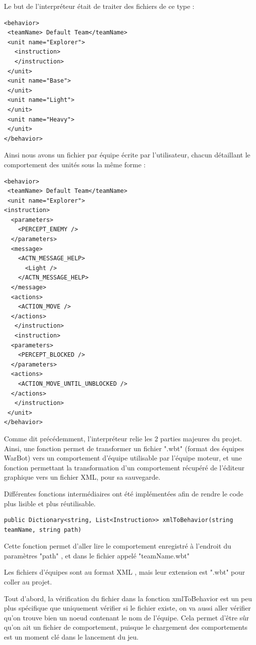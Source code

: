 \documentclass{report}
\begin{document}
Le but de l'interpréteur était de traiter des fichiers de ce type :
\begin{lstlisting}[frame=single]
<behavior>
 <teamName> Default Team</teamName>
 <unit name="Explorer">
   <instruction>
   </instruction>
 </unit>
 <unit name="Base">
 </unit>
 <unit name="Light">
 </unit>
 <unit name="Heavy">
 </unit>
</behavior>
\end{lstlisting}

Ainsi nous avons un fichier par équipe écrite par l'utilisateur, chacun détaillant le comportement des unités sous la même forme :

\begin{lstlisting}[frame=single]
<behavior>
 <teamName> Default Team</teamName>
 <unit name="Explorer">
<instruction>
  <parameters>
    <PERCEPT_ENEMY />
  </parameters>
  <message>
    <ACTN_MESSAGE_HELP>
      <Light />
    </ACTN_MESSAGE_HELP>
  </message>
  <actions>
    <ACTION_MOVE />
  </actions>
   </instruction>
   <instruction>
  <parameters>
    <PERCEPT_BLOCKED />
  </parameters>
  <actions>
    <ACTION_MOVE_UNTIL_UNBLOCKED />
  </actions>
   </instruction>
 </unit>
</behavior>
\end{lstlisting}

Comme dit précédemment, l'interpréteur relie les 2 parties majeures du projet.
Ainsi, une fonction permet de transformer un fichier ".wbt" (format des équipes WarBot) vers un comportement d'équipe utilisable par l'équipe moteur, et une fonction permettant la transformation d'un comportement récupéré de l'éditeur graphique vers un fichier XML, pour sa sauvegarde.

Différentes fonctions intermédiaires ont été implémentées afin de rendre le code plus lisible et plus réutilisable.
\begin{lstlisting}[frame=single]
public Dictionary<string, List<Instruction>> xmlToBehavior(string teamName, string path)
\end{lstlisting}
Cette fonction permet d'aller lire le comportement enregistré à l'endroit du paramètres "path" , et dans le fichier appelé "teamName.wbt"

Les fichiers d'équipes sont au format XML , mais leur extension est ".wbt" pour coller au projet.

Tout d'abord, la vérification du fichier dans la fonction xmlToBehavior est un peu plus spécifique que uniquement vérifier si le fichier existe, on va aussi aller vérifier qu'on trouve bien un noeud contenant le nom de l'équipe. Cela permet d'être sûr qu'on ait un fichier de comportement, puisque le chargement des comportements est un moment clé dans le lancement du jeu.
\end{document}
